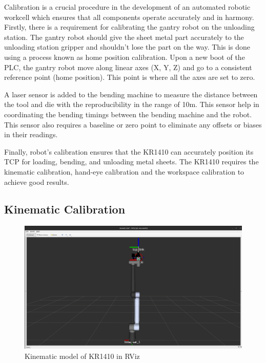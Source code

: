 
Calibration is a crucial procedure in the development of 
an automated robotic workcell which ensures that all components
operate accurately and in harmony. Firstly, there is a requirement for calibrating the gantry robot on the unloading station. The gantry robot should give the sheet metal part accurately to the unloading station gripper and shouldn't lose the part on the way. This is done using a process known as home position calibration. Upon a new boot of the PLC, the gantry robot move along linear axes (X, Y, Z) and go to a consistent reference point (home position). This point is where all the axes are set to zero.

A laser sensor is added to the bending machine to measure the distance between the tool and die with the reproducibility in the range of 10\textmu m. This sensor help in coordinating the bending timings between the bending machine and the robot. This sensor also requires a baseline or zero point to eliminate any offsets or biases in their readings.

Finally, robot's calibration ensures that the KR1410 can accurately position its TCP for loading, bending, and unloading metal sheets. The KR1410 requires the kinematic calibration, hand-eye calibration and the workspace calibration to achieve good results.

\subsection{Kinematic Calibration}
\label{subsec:kinematic-calibration}

\begin{figure}[h]
    \centering
    \includegraphics[width=1\textwidth]{6. System Integration and Testing/6.2 Calibration Procedures/tcp.PNG}
    \caption{Kinematic model of KR1410 in RViz}
    \label{fig:tcp}
\end{figure}



